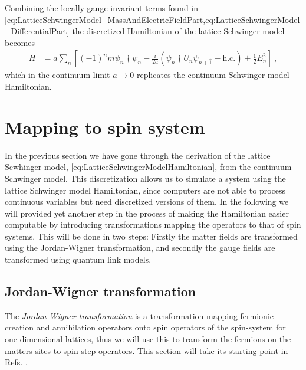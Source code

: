 \documentclass[../main.tex]{subfiles} %
\begin{document}
Combining the locally gauge invariant terms found in \cref{eq:LatticeSchwingerModel_MassAndElectricFieldPart,eq:LatticeSchwingerModel_DifferentialPart} the discretized Hamiltonian of the lattice Schwinger model becomes
\begin{align} \label{eq:LatticeSchwingerModelHamiltonian}
    H &= a \sum_n \left[ (-1)^n m \psi_n\dagger \psi_n - \frac{i}{2a}\left(\psi_n\dagger U_n\psi_{n+\hat{1}} - \mathrm{h.c.}\right) + \frac{1}{2}E_n^2 \right] \: ,
\end{align}
which in the continuum limit $a \rightarrow 0$ replicates the continuum Schwinger model Hamiltonian.




\section{Mapping to spin system} \label{sec:MappingToSpinSystem}

In the previous section we have gone through the derivation of the lattice Scwhinger model, \cref{eq:LatticeSchwingerModelHamiltonian}, from the continuum Schwinger model. This discretization allows us to simulate a system using the lattice Schwinger model Hamiltonian, since computers are not able to process continuous variables but need discretized versions of them. In the following we will provided yet another step in the process of making the Hamiltonian easier computable by introducing transformations mapping the operators to that of spin systems. This will be done in two steps: Firstly the matter fields are transformed using the Jordan-Wigner transformation, and secondly the gauge fields are transformed using quantum link models.



\subsection{Jordan-Wigner transformation} \label{sec:Jordan-WignerTransformation}

The \emph{Jordan-Wigner transformation} is a transformation mapping fermionic creation and annihilation operators onto spin operators of the spin-\half system for one-dimensional lattices, thus we will use this to transform the fermions on the matters sites to spin step operators. This section will take its starting point in Refs. \cite{jordan-wigner_1928, banksSusskindKogut_StrongCoupling_1976, panyella_masterThesis_2019}.
\end{document}
